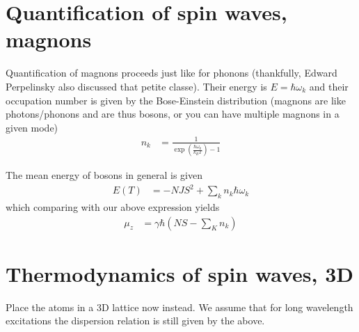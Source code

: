 \documentclass[10pt]{report}
\begin{document}
\section{Quantification of spin waves, magnons}

Quantification of magnons proceeds just like for phonons (thankfully, Edward Perpelinsky also discussed that petite classe). Their energy is $E = \hbar \omega_k$ and their occupation number is given by the Bose-Einstein distribution (magnons are like photons/phonons and are thus bosons, or you can have multiple magnons in a given mode)
\begin{align}
    n_k &= \frac{1}{\exp\left( \frac{\hbar \omega_k}{k_BT} \right) - 1}
\end{align}

The mean energy of bosons in general is given
\begin{align}
    E(T) &= -NJS^2 + \sum\limits_{k}^{}n_k \hbar \omega_k
\end{align}
which comparing with our above expression yields
\begin{align}
    \mu_z &= \gamma \hbar\left( NS - \sum\limits_{K}^{}n_k \right)
\end{align}

\section{Thermodynamics of spin waves, 3D}

Place the atoms in a 3D lattice now instead. We assume that for long wavelength excitations the dispersion relation is still given by the above.
\end{document}
